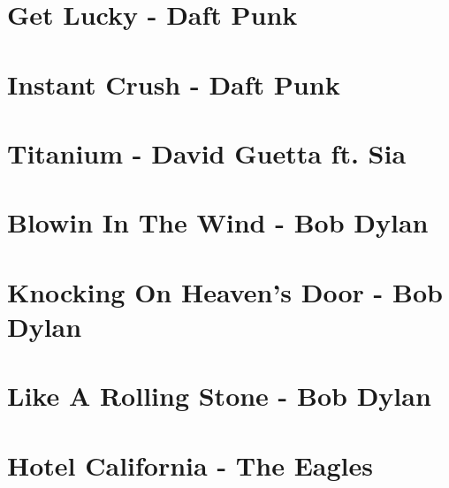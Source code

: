 \documentclass{guitartabs}
\begin{document}
\section{Get Lucky - Daft Punk}
\begin{guitar}

\end{guitar}


\section{Instant Crush - Daft Punk}
\begin{guitar}

\end{guitar}


\section*{Titanium - David Guetta ft. Sia}
\begin{guitar}

\end{guitar}



\section*{Blowin In The Wind - Bob Dylan}
\begin{guitar}

\end{guitar}



\section{Knocking On Heaven's Door - Bob Dylan}
\begin{guitar}

\end{guitar}

\section*{Like A Rolling Stone - Bob Dylan}
\begin{guitar}

\end{guitar}





\section{Hotel California - The Eagles}
\begin{guitar}

\end{guitar}
\end{document}
